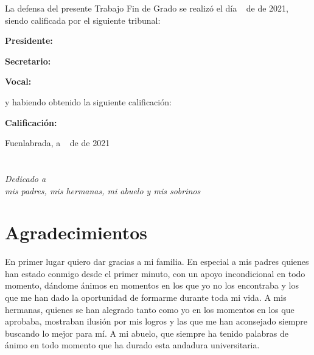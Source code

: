 \documentclass[a4paper, 12pt]{book}
\begin{document}
\vspace{1cm}
La defensa del presente Trabajo Fin de Grado se realizó el día \qquad$\;\,$ de \qquad\qquad\qquad\qquad \newline de 2021, siendo calificada por el siguiente tribunal:


\vspace{0.5cm}
\textbf{Presidente:}

\vspace{1.2cm}
\textbf{Secretario:}

\vspace{1.2cm}
\textbf{Vocal:}


\vspace{1.2cm}
y habiendo obtenido la siguiente calificación:

\vspace{1cm}
\textbf{Calificación:}


\vspace{1cm}
\begin{flushright}
Fuenlabrada, a \qquad$\;\,$ de \qquad\qquad\qquad\qquad de 2021
\end{flushright}


\chapter*{}
\begin{flushright}
\textit{Dedicado a \\
mis padres, mis hermanas, mi abuelo y mis sobrinos}
\end{flushright}


\chapter*{Agradecimientos}
En primer lugar quiero dar gracias a mi familia. En especial a mis padres quienes han estado conmigo desde el primer minuto, con un apoyo incondicional en todo momento, dándome ánimos en momentos en los que yo no los encontraba y los que me han dado la oportunidad de formarme durante toda mi vida. A mis hermanas, quienes se han alegrado tanto como yo en los momentos en los que aprobaba, mostraban ilusión por mis logros y las que me han aconsejado siempre buscando lo mejor para mí. A mi abuelo, que siempre ha tenido palabras de ánimo en todo momento que ha durado esta andadura universitaria.
\end{document}
